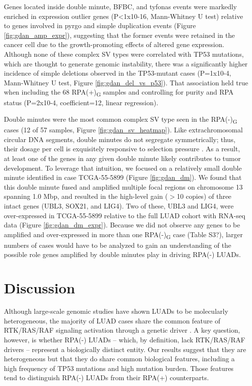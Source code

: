 \documentclass[phd,tocprelim]{cornell}
\begin{document}
Genes located inside double minute, BFBC, and tyfonas events were markedly enriched in expression outlier genes (P<1x10-16, Mann-Whitney U test) relative to genes involved in pyrgo and simple duplication events (Figure \ref{fig:gdan_amp_expr}), suggesting that the former events were retained in the cancer cell due to the growth-promoting effects of altered gene expression. Although none of these complex SV types were correlated with TP53 mutations, which are thought to generate genomic instability, there was a significantly higher incidence of simple deletions observed in the TP53-mutant cases (P=1x10-4, Mann-Whitney U test, Figure \ref{fig:gdan_del_vs_p53}). That association held true when including the 68 RPA(+)\textsubscript{G} samples and controlling for purity and RPA status (P=2x10-4, coefficient=12, linear regression).

Double minutes were the most common complex SV type seen in the RPA(-)\textsubscript{G} cases (12 of 57 samples, Figure \ref{fig:gdan_sv_heatmap}). Like extrachromosomal circular DNA segments, double minutes do not segregate symmetrically; thus, their dosage per cell is exquisitely responsive to selection pressure \cite{Verhaak2019,Wu2019-ap}. As a result, at least one of the genes in any given double minute likely contributes to tumor development. To leverage that intuition, we focused on a relatively small double minute identified in case TCGA-55-5899 (Figure \ref{fig:gdan_dm}). We found that this double minute fused and amplified multiple focal regions on chromosome 13 spanning 1.0 Mbp, and resulted in the high-level gain ($>$10 copies) of three intact genes (UBL3, SOX21, and LIG4). Two of these, UBL3 and LIG4, were over-expressed in TCGA-55-5899 relative to the full LUAD cohort with RNA-seq data (Figure \ref{fig:gdan_dm_expr}). Because we did not observe any genes to be amplified and over-expressed in more than one RPA(-)\textsubscript{G} case (Table S3?), larger numbers of cases would have to be analyzed to gain an understanding of the possible role genes amplified by double minutes play in driving RPA(-) LUADs.

\section{Discussion}
Although large-scale genomic studies have shown LUADs to be molecularly heterogeneous, the majority of LUAD cases share the common feature of RTK/RAS/RAF signaling activation through a genetic driver \cite{Desai2014-qe,Swanton2016-lg}. A key question, however, is whether RPA(-) LUADs – which, by definition, lack RTK/RAS/RAF drivers – represent a biologically distinct entity. Our results suggest that they are heterogeneous but that they do share common biological features, including a high frequency of TP53 mutations and high mutation burden. Those features tend to distinguish RPA(-) LUADs from their RPA(+) counterparts.
\end{document}
